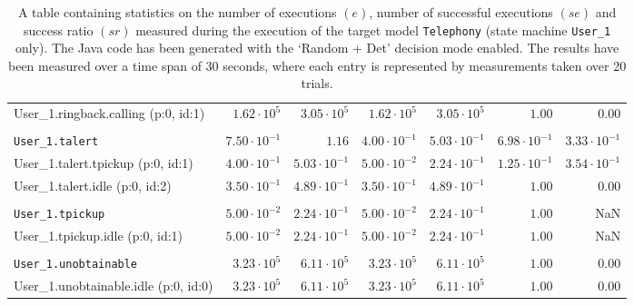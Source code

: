 \begin{table}[htbp]
{\begin{tabular}{lrrrrrr}
\hspace{3mm}User\_1.ringback.calling (p:0, id:1)     &  $1.62 \cdot 10^{5}$ &  $3.05 \cdot 10^{5}$ &  $1.62 \cdot 10^{5}$ &  $3.05 \cdot 10^{5}$ &               $1.00$ &               $0.00$ \\
\\[-8pt]\texttt{User\_1.talert}                      & $7.50 \cdot 10^{-1}$ &               $1.16$ & $4.00 \cdot 10^{-1}$ & $5.03 \cdot 10^{-1}$ & $6.98 \cdot 10^{-1}$ & $3.33 \cdot 10^{-1}$ \\
\hspace{3mm}User\_1.talert.tpickup (p:0, id:1)       & $4.00 \cdot 10^{-1}$ & $5.03 \cdot 10^{-1}$ & $5.00 \cdot 10^{-2}$ & $2.24 \cdot 10^{-1}$ & $1.25 \cdot 10^{-1}$ & $3.54 \cdot 10^{-1}$ \\
\hspace{3mm}User\_1.talert.idle (p:0, id:2)          & $3.50 \cdot 10^{-1}$ & $4.89 \cdot 10^{-1}$ & $3.50 \cdot 10^{-1}$ & $4.89 \cdot 10^{-1}$ &               $1.00$ &               $0.00$ \\
\\[-8pt]\texttt{User\_1.tpickup}                     & $5.00 \cdot 10^{-2}$ & $2.24 \cdot 10^{-1}$ & $5.00 \cdot 10^{-2}$ & $2.24 \cdot 10^{-1}$ &               $1.00$ &                  NaN \\
\hspace{3mm}User\_1.tpickup.idle (p:0, id:1)         & $5.00 \cdot 10^{-2}$ & $2.24 \cdot 10^{-1}$ & $5.00 \cdot 10^{-2}$ & $2.24 \cdot 10^{-1}$ &               $1.00$ &                  NaN \\
\\[-8pt]\texttt{User\_1.unobtainable}                &  $3.23 \cdot 10^{5}$ &  $6.11 \cdot 10^{5}$ &  $3.23 \cdot 10^{5}$ &  $6.11 \cdot 10^{5}$ &               $1.00$ &               $0.00$ \\
\hspace{3mm}User\_1.unobtainable.idle (p:0, id:0)    &  $3.23 \cdot 10^{5}$ &  $6.11 \cdot 10^{5}$ &  $3.23 \cdot 10^{5}$ &  $6.11 \cdot 10^{5}$ &               $1.00$ &               $0.00$ \\
\bottomrule
\end{tabular}
}
\caption{A table containing statistics on the number of executions $(e)$, number of successful executions $(se)$ and success ratio $(sr)$ measured during the execution of the target model \texttt{Telephony} (state machine \texttt{User\_1} only). The Java code has been generated with the `Random + Det' decision mode enabled. The results have been measured over a time span of 30 seconds, where each entry is represented by measurements taken over 20 trials.}
\label{table:frequency_results_telephony_random_det_user_1}
\end{table}